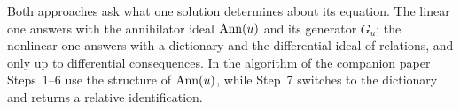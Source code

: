 \begin{keypoint}
Both approaches ask what one solution determines about its equation. The linear one answers with the annihilator ideal $\operatorname{Ann}(u)$ and its generator $G_u$; the nonlinear one answers with a dictionary and the differential ideal of relations, and only up to differential consequences. In the algorithm of the companion paper Steps~1--6 use the structure of $\operatorname{Ann}(u)$, while Step~7 switches to the dictionary and returns a relative identification.
\end{keypoint}

